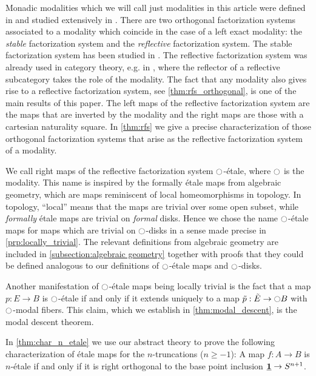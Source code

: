 \documentclass[9pt,twosided]{amsart}
\begin{document}
Monadic modalities which we will call just modalities in this article were defined in \cite[Section 7.7]{UFP} and studied extensively in \cite{RijkeSpittersShulman}.
There are two orthogonal factorization systems associated to a modality which coincide in the case of a left exact modality:
the \emph{stable} factorization system and the \emph{reflective} factorization system.
The stable factorization system has been studied in \cite{RijkeSpittersShulman}.
The reflective factorization system was already used in category theory, e.g. in \cite{cassidy_hebert_kelly_1985},
where the reflector of a reflective subcategory takes the role of the modality.
The fact that any modality also gives rise to a reflective factorization system, see \cref{thm:rfs_orthogonal}, is one of the main results of this paper. The left maps of the reflective factorization system are the maps that are inverted by the modality and the right maps are those with a cartesian naturality square. In \cref{thm:rfs} we give a precise characterization of those orthogonal factorization systems that arise as the reflective factorization system of a modality.

We call right maps of the reflective factorization system ${\ocircle}$-étale, where ${\ocircle}$ is the modality.
This name is inspired by the formally étale maps from algebraic geometry,
which are maps reminiscent of local homeomorphisms in topology.
In topology, ``local'' means that the maps are trivial over some open subset, while \emph{formally} étale maps are trivial on \emph{formal} disks.
Hence we chose the name ${\ocircle}$-étale maps for maps which are trivial on ${\ocircle}$-disks in a sense made precise in \cref{prp:locally_trivial}.
The relevant definitions from algebraic geometry are included in \cref{subsection:algebraic geometry}
together with proofs that they could be defined analogous to our definitions of ${\ocircle}$-étale maps and ${\ocircle}$-disks.

Another manifestation of ${\ocircle}$-\'etale maps being locally trivial is the fact that a map $p:E\to B$ is ${\ocircle}$-\'etale if and only if it extends uniquely to a map $\tilde{p}:\tilde{E}\to {\ensuremath{\ocircle}} B$ with ${\ocircle}$-modal fibers. This claim, which we establish in \cref{thm:modal_descent}, is the modal descent theorem. 

In \cref{thm:char_n_etale} we use our abstract theory to prove the following characterization of étale maps for the $n$-truncations ($n\geq -1$):
A map $f:A\to B$ is $n$-\'etale if and only if it is right orthogonal to the base point inclusion $\underline{\mathbf{1}}\to S^{n+1}$.
\end{document}
